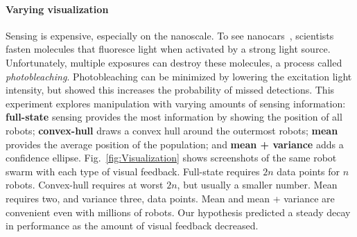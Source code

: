 \paragraph{Varying visualization}

Sensing is expensive, especially on the nanoscale. To see nanocars~\cite{Chiang2011}, scientists fasten molecules that fluoresce light when activated by a strong light source. Unfortunately, multiple exposures can destroy these molecules, a process called \emph{photobleaching}. Photobleaching can be minimized by lowering the excitation light intensity, but \cite{Cazes2001} showed this increases the probability of missed detections.  This experiment explores manipulation with varying amounts of sensing information: {\bf full-state} sensing provides the most information by showing the position of all robots; {\bf convex-hull} draws a convex hull around the outermost robots; {\bf mean} provides the average position of the population; and {\bf mean + variance} adds a confidence ellipse. Fig.~\ref{fig:Visualization} shows screenshots of the same robot swarm with each type of visual feedback. Full-state requires $2n$ data points for $n$ robots. Convex-hull requires at worst $2n$, but usually a smaller number.  Mean requires two, and variance three, data points.  Mean and mean + variance are convenient even with millions of robots. Our hypothesis predicted a steady decay in performance as the amount of visual feedback decreased.

%


